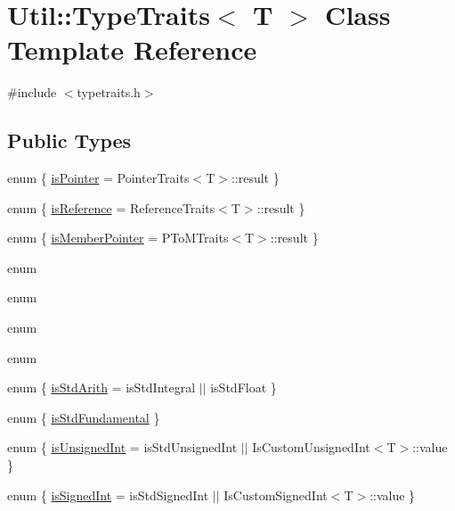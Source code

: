 \hypertarget{classUtil_1_1TypeTraits}{}\section{Util\+:\+:Type\+Traits$<$ T $>$ Class Template Reference}
\label{classUtil_1_1TypeTraits}


{\ttfamily \#include $<$typetraits.\+h$>$}

\subsection*{Public Types}
\begin{DoxyCompactItemize}
\item 
enum \{ \mbox{\hyperlink{classUtil_1_1TypeTraits_ad90505183742eb4b62bc41bd4121fc19a0813f58ed7af0a00a07d0ba641cc3bba}{is\+Pointer}} = Pointer\+Traits$<$T$>$\+:\+:result
 \}
\item 
enum \{ \mbox{\hyperlink{classUtil_1_1TypeTraits_ad8ec6b7fcee82a1169b89d2da8419edaac0cdaf0e77f765430820e96bb7cf4619}{is\+Reference}} = Reference\+Traits$<$T$>$\+:\+:result
 \}
\item 
enum \{ \mbox{\hyperlink{classUtil_1_1TypeTraits_ad2b47cd121495f38449b1f8c10afb067abe04caa758890fee25930d96123265d2}{is\+Member\+Pointer}} = P\+To\+M\+Traits$<$T$>$\+:\+:result
 \}
\item 
enum 
\item 
enum 
\item 
enum 
\item 
enum 
\item 
enum \{ \mbox{\hyperlink{classUtil_1_1TypeTraits_a1cfd1423cce5a0b762ee8f5c9c2f004ea3017f19abc6084d7e144891aaf5adb0f}{is\+Std\+Arith}} = is\+Std\+Integral $\vert$$\vert$ is\+Std\+Float
 \}
\item 
enum \{ \mbox{\hyperlink{classUtil_1_1TypeTraits_ad2a782274bd24165717b068f49fd6851ab40fb122d222179d83db4acfdd8d3887}{is\+Std\+Fundamental}}
 \}
\item 
enum \{ \mbox{\hyperlink{classUtil_1_1TypeTraits_a88f2e9de4143a8e63402e6ec6830c5f5a491d7fd4750cb0d1a2dcbeb5fc3456d1}{is\+Unsigned\+Int}} = is\+Std\+Unsigned\+Int $\vert$$\vert$ Is\+Custom\+Unsigned\+Int$<$T$>$\+:\+:value
 \}
\item 
enum \{ \mbox{\hyperlink{classUtil_1_1TypeTraits_a3ba071c65cca8d8bc84e736a182a1569a238eb902c14c6c61c1f4baa46e56c461}{is\+Signed\+Int}} = is\+Std\+Signed\+Int $\vert$$\vert$ Is\+Custom\+Signed\+Int$<$T$>$\+:\+:value
 \}
\item 
$$
\end{DoxyCompactItemize}
